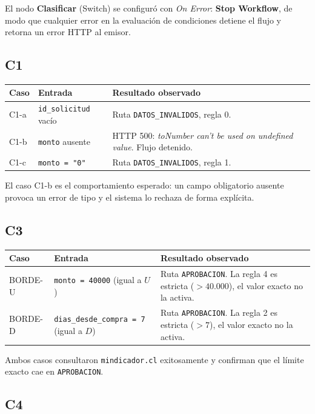 \documentclass[12pt,a4paper]{article}
\begin{document}
El nodo \textbf{Clasificar} (Switch) se configur\'o con \textit{On Error}: \textbf{Stop Workflow}, de modo que cualquier error en la evaluaci\'on de condiciones detiene el flujo y retorna un error HTTP al emisor.

\subsection{C1}

\begin{center}
\begin{tabularx}{\textwidth}{lXX}
\toprule
Caso & Entrada & Resultado observado \\
\midrule
C1-a & \texttt{id\_solicitud} vac\'io & Ruta \texttt{DATOS\_INVALIDOS}, regla 0. \\
C1-b & \texttt{monto} ausente & HTTP 500: \textit{toNumber can't be used on undefined value}. Flujo detenido. \\
C1-c & \texttt{monto = "0"} & Ruta \texttt{DATOS\_INVALIDOS}, regla 1. \\
\bottomrule
\end{tabularx}
\end{center}

El caso C1-b es el comportamiento esperado: un campo obligatorio ausente provoca un error de tipo y el sistema lo rechaza de forma expl\'icita.

\subsection{C3}

\begin{center}
\begin{tabularx}{\textwidth}{lXX}
\toprule
Caso & Entrada & Resultado observado \\
\midrule
BORDE-U & \texttt{monto = 40000} (igual a $U$) & Ruta \texttt{APROBACION}. La regla 4 es estricta ($> 40.000$), el valor exacto no la activa. \\
BORDE-D & \texttt{dias\_desde\_compra = 7} (igual a $D$) & Ruta \texttt{APROBACION}. La regla 2 es estricta ($> 7$), el valor exacto no la activa. \\
\bottomrule
\end{tabularx}
\end{center}

Ambos casos consultaron \texttt{mindicador.cl} exitosamente y confirman que el l\'imite exacto cae en \texttt{APROBACION}.

\subsection{C4}
\end{document}
